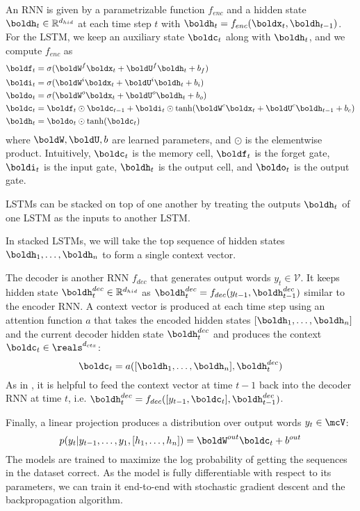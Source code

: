 \documentclass[11pt]{report}
\begin{document}
An RNN is given by a parametrizable function $f_{enc}$ and a hidden state $\boldh_t \in \mathbb{R}^{ d_{hid}}$ at each time step $t$ with $\boldh_t = f_{enc}(\boldx_t, \boldh_{t-1})$. For the LSTM, we keep an auxiliary state $\boldc_t$ along with $\boldh_t$, and we compute $f_{enc}$ as
\begin{align}
\boldf_t &= \sigma(\boldW^f \boldx_t + \boldU^f \boldh_t + b_f) \\
\boldi_t &= \sigma(\boldW^i \boldx_t + \boldU^i \boldh_t + b_i) \\
\boldo_t &= \sigma(\boldW^o \boldx_t + \boldU^o \boldh_t + b_o) \\
\boldc_t &= \boldf_t \odot \boldc_{t-1}  + \boldi_t \odot \tanh(\boldW^c \boldx_t + \boldU^c \boldh_{t-1} + b_c) \\
\boldh_t &= \boldo_t \odot \tanh(\boldc_t)
\end{align}
where $\boldW, \boldU, b$ are learned parameters, and $\odot$ is the elementwise product. 
Intuitively, $\boldc_t$ is the memory cell, $\boldf_t$ is the forget gate, $\boldi_t$ is the input gate, $\boldh_t$ is the output cell, and $\boldo_t$ is the output gate.

LSTMs can be stacked on top of one another by treating the outputs $\boldh_t$ of one LSTM as the inputs to another LSTM.

In stacked LSTMs, we will take the top sequence of hidden states $\boldh_1, \ldots, \boldh_n$ to form a single context vector.


The decoder is another RNN $f_{dec}$ that generates output words $y_t \in \mathcal{V}$. It keeps hidden state $\boldh_t^{dec} \in \mathbb{R}^{d_{hid}}$ as $\boldh_t^{dec} = f_{dec}(y_{t-1}, \boldh_{t-1}^{dec})$ similar to the encoder RNN.
A context vector is produced at each time step using an attention function $a$ that takes the encoded hidden states $[\boldh_1, \ldots, \boldh_n]$ and the current decoder hidden state $\boldh_t^{dec}$ and produces the context $\boldc_t \in \reals^{d_{ctx}}$:
\begin{equation}
\boldc_t = a([\boldh_1, \ldots, \boldh_n], \boldh_t^{dec})
\end{equation}
As in \citet{luong2015effective}, it is helpful to feed the context vector at time $t-1$ back into the decoder RNN at time $t$, i.e. $\boldh_t^{dec} = f_{dec}([y_{t-1}, \boldc_t], \boldh_{t-1}^{dec})$.

Finally, a linear projection produces a distribution over output words $y_t \in \mcV$:
\begin{equation}
p(y_t | y_{t-1}, \ldots, y_1, [h_1, \ldots, h_n]) = \boldW^{out}\boldc_t + b^{out}
\end{equation}
The models are trained to maximize the log probability of getting the sequences in the dataset correct. As the model is fully differentiable with respect to its parameters, we can train it end-to-end with stochastic gradient descent and the backpropagation algorithm.
\end{document}
